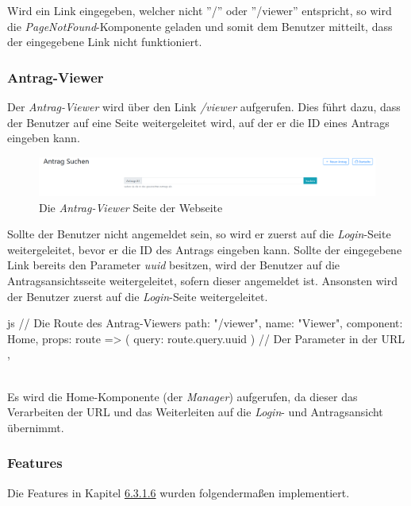 Wird ein Link eingegeben, welcher nicht ''/'' oder ''/viewer'' entspricht, so wird die \textit{PageNotFound}-Komponente geladen und somit dem Benutzer mitteilt, dass der eingegebene Link nicht funktioniert.
\subsubsection{Antrag-Viewer}
\label{sec:antrag_viewer}
Der \textit{Antrag-Viewer} wird über den Link \textit{/viewer} aufgerufen. Dies führt dazu, dass der Benutzer auf eine Seite weitergeleitet wird, auf der er die ID eines Antrags eingeben kann.
\begin{figure}[H]
	\centering
	\includegraphics[width=1\linewidth]{images/antrag_viewer}
	\caption[Webseite \textit{Antrag-Viewer}]{Die \textit{Antrag-Viewer} Seite der Webseite}
	\label{fig:antragviewer}
\end{figure}

Sollte der Benutzer nicht angemeldet sein, so wird er zuerst auf die \textit{Login}-Seite weitergeleitet, bevor er die ID des Antrags eingeben kann. Sollte der eingegebene Link bereits den Parameter \textit{uuid} besitzen, wird der Benutzer auf die Antragsansichtsseite weitergeleitet, sofern dieser angemeldet ist. Ansonsten wird der Benutzer zuerst auf die \textit{Login}-Seite weitergeleitet.
\begin{code}{js}
	{
		// Die Route des Antrag-Viewers
		path: "/viewer",
		name: "Viewer",
		component: Home,
		props: route => ({ query: route.query.uuid }) // Der Parameter in der URL
	},
\end{code}
~\\
Es wird die Home-Komponente (der \textit{Manager}) aufgerufen, da dieser das Verarbeiten der URL und das Weiterleiten auf die \textit{Login}- und Antragsansicht übernimmt.
\newpage
\subsubsection{Features}
Die Features in Kapitel \hyperref[sec:feature]{6.3.1.6} wurden folgendermaßen implementiert.

